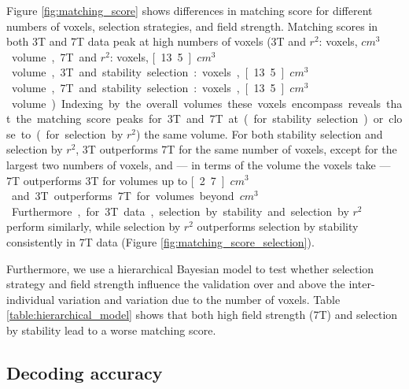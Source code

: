 Figure \ref{fig:matching_score} shows differences in matching score for different numbers of voxels, selection strategies, and field strength. Matching scores in both 3T and 7T data peak at high numbers of voxels (3T and $r^{2}$: \unit[1000]{voxels}, \unit[27]{$cm^{3}$} volume, 7T and $r^{2}$: \unit[5000]{voxels}, \unit[13.5]{$cm^{3}$} volume, 3T and stability selection: \unit[500]{voxels}, \unit[13.5]{$cm^{3}$} volume, 7T and stability selection: \unit[5000]{voxels}, \unit[13.5]{$cm^{3}$} volume). Indexing by the overall volumes these voxels encompass reveals that the matching score peaks for 3T and 7T at (for stability selection) or close to (for selection by $r^{2}$) the same volume. For both stability selection and selection by $r^{2}$, 3T outperforms 7T for the same number of voxels, except for the largest two numbers of voxels, and --- in terms of the volume the voxels take --- 7T outperforms 3T for volumes up to \unit[2.7]{$cm^{3}$} and 3T outperforms 7T for volumes beyond \unit[27]{$cm^{3}$}. Furthermore, for 3T data, selection by stability and selection by $r^{2}$ perform similarly, while selection by $r^{2}$ outperforms selection by stability consistently in 7T data (Figure \ref{fig:matching_score_selection}).

Furthermore, we use a hierarchical Bayesian model to test whether selection strategy and field strength influence the validation over and above the inter-individual variation and variation due to the number of voxels.
Table \ref{table:hierarchical_model} shows that both high field strength (7T) and selection by stability lead to a worse matching score.


\subsection*{Decoding accuracy}


